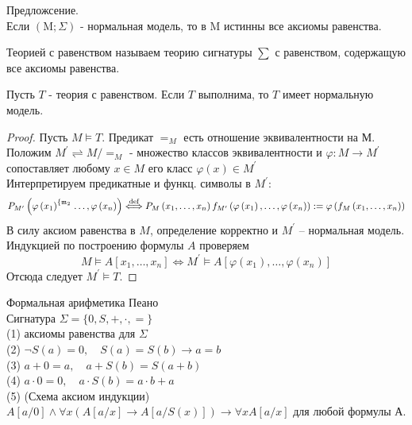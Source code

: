 Предложсение.\\
Если $(\mathrm{M} ; \Sigma)$ - нормальная модель, то в $\mathrm{M}$ истинны все
аксиомы равенства.
\begin{defn}
Теорией с равенством называем теорию сигнатуры $\sum$ с
равенством, содержащую все аксиомы равенства.
\end{defn}
\vskip 0.2in

\begin{theo}
Пусть $T$ - теория с равенством. Если $T$ выполнима, то $T$ имеет нормальную модель.
\end{theo}
\begin{proof}
Пусть $M \vDash T .$ Предикат $=_{M}$ есть отношение эквивалентности на М. Положим $M^{\prime} \rightleftharpoons M /=_{M}$ - множество классов эквивалентности и $\varphi: M \rightarrow M^{\prime}$ сопоставляет любому $x \in M$ его класс $\varphi(x) \in M^{\prime}$\\
Интерпретируем предикатные и функц. символы в $M^{\prime}:$ 
$$P_{M^{\prime}}\left(\varphi\left(x_{1}\right)^{\left\{\mathfrak{m}_{2}\right.} \ldots, \varphi\left(x_{n}\right)\right) \stackrel{\text { def }}{\Longleftrightarrow} P_{M}\left(x_{1}, \ldots, x_{n}\right)\\
f_{M^{\prime}}\left(\varphi\left(x_{1}\right), \ldots, \varphi\left(x_{n}\right)\right):=\varphi\left(f_{M}\left(x_{1}, \ldots, x_{n}\right)\right)
$$
В силу аксиом равенства в $M$, определение корректно и $M^{\prime}$ -- нормальная модель.\\
Индукцией по построению формулы $A$ проверяем
$$
M \vDash A\left[x_{1}, \ldots, x_{n}\right] \Longleftrightarrow M^{\prime} \vDash A\left[\varphi\left(x_{1}\right), \ldots, \varphi\left(x_{n}\right)\right]
$$
Отсюда следует $M^{\prime} \vDash T$.
\end{proof}
\vskip 0.4in

Формальная арифметика Пеано\\
Сигнатура $\Sigma=\{0, S,+, \cdot,=\}$\\
(1) аксиомы равенства для $\Sigma$\\
(2) $\neg S(a)=0, \quad S(a)=S(b) \rightarrow a=b$\\
(3) $a+0=a, \quad a+S(b)=S(a+b)$\\
(4) $a \cdot 0=0, \quad a \cdot S(b)=a \cdot b+a$\\
(5) (Схема аксиом индукции)
$A[a / 0] \wedge \forall x(A[a / x] \rightarrow A[a / S(x)]) \rightarrow \forall x A[a / x]$
для любой формулы А.
\vskip 0.3in

